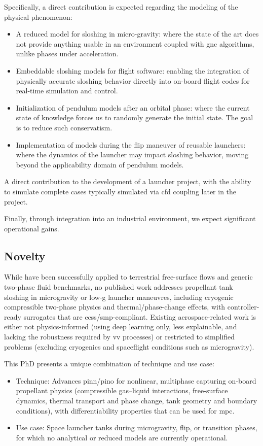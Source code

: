 \documentclass[12pt]{article}
\begin{document}
	Specifically, a direct contribution is expected regarding the modeling of the physical phenomenon:
	\begin{itemize}
		\item A reduced model for sloshing in micro-gravity: where the state of the art does not provide anything usable in an environment coupled with \acrshort{gnc} algorithms, unlike phases under acceleration.
		\item Embeddable sloshing models for flight software: enabling the integration of physically accurate sloshing behavior directly into on-board flight codes for real-time simulation and control.
		\item Initialization of pendulum models after an orbital phase: where the current state of knowledge forces us to randomly generate the initial state. The goal is to reduce such conservatism.
		\item Implementation of models during the flip maneuver of reusable launchers: where the dynamics of the launcher may impact sloshing behavior, moving beyond the applicability domain of pendulum models.
	\end{itemize}
	A direct contribution to the development of a launcher project, with the ability to simulate complete cases typically simulated via \acrshort{cfd} coupling later in the project.
	
	Finally, through integration into an industrial environment, we expect significant operational gains.
	
	\subsection*{Novelty}
	
	While  have been successfully applied to terrestrial free-surface flows and generic two-phase fluid benchmarks, no published work addresses propellant tank sloshing in microgravity or low-g launcher maneuvres, including cryogenic compressible two-phase physics and thermal/phase-change effects, with controller-ready surrogates that are \acrshort{ecss}/\acrshort{smp}-compliant.
	Existing aerospace-related work is either not physics-informed (using deep learning only, less explainable, and lacking the robustness required by \acrshort{vv} processes) or restricted to simplified problems (excluding cryogenics and spaceflight conditions such as microgravity).
	
	
	This PhD presents a unique combination of technique and use case:
	
	\begin{itemize}
		\item Technique: Advances \acrshort{pinn}/\acrshort{pino} for nonlinear, multiphase  capturing on-board propellant physics (compressible gas–liquid interactions, free-surface dynamics, thermal transport and phase change, tank geometry and boundary conditions), with differentiability properties that can be used for \gls{mpc}.
		
		\item Use case: Space launcher tanks during microgravity, flip, or transition phases, for which no analytical or reduced models are currently operational.
	\end{itemize}
	
\end{document}
